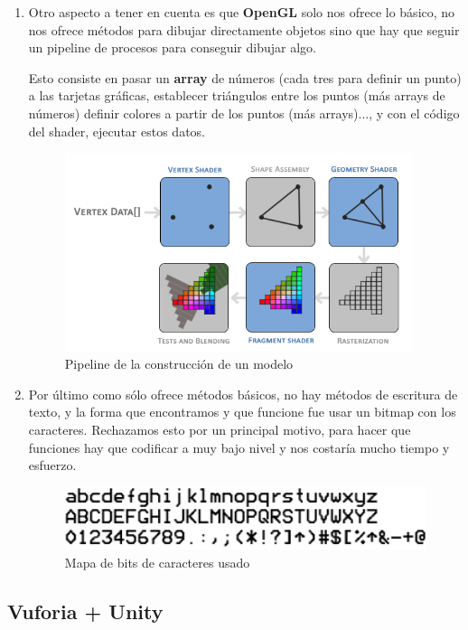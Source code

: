 \begin{enumerate}
    \item Otro aspecto a tener en cuenta es que \textbf{OpenGL} solo nos ofrece lo básico, no nos ofrece métodos para dibujar 
    directamente objetos sino que hay que seguir un pipeline de procesos para conseguir dibujar algo.
    \newline
    \begin{flushleft}
    Esto consiste en pasar un \textbf{array} de números (cada tres para definir un punto) 
    a las tarjetas gráficas, establecer triángulos entre los puntos (más arrays de números) 
    definir colores a partir de los puntos (más arrays)..., y con el código del shader, ejecutar 
    estos datos.
    \begin{figure}
        \centering
        \includegraphics[width=4in]{figures/pipeline.png}
        \caption{Pipeline de la construcción de un modelo}
    \end{figure}
    \end{flushleft}
    \newpage
    \item Por último como sólo ofrece métodos básicos, no hay métodos de escritura de texto, y la forma que 
    encontramos y que funcione fue usar un bitmap con los caracteres. Rechazamos esto por un principal motivo, para hacer que funciones hay que codificar a muy bajo nivel y 
    nos costaría mucho tiempo y esfuerzo.
    \begin{figure}
        \centering
        \includegraphics[width=5in]{figures/bitmap-font.png}
        \caption{Mapa de bits de caracteres usado}
    \end{figure}
\end{enumerate}
 

\subsection{Vuforia + Unity} 
\label{makereference3.6.4}

